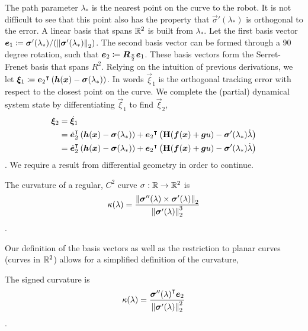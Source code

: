 \documentclass[oneside, 11pt]{book}
\begin{document}
The path parameter $\lambda_*$ is the nearest point on the curve to the robot. It is not difficult to see that this point also has the property that $\vec{\sigma}'(\lambda_*)$ is orthogonal to the error. A linear basis that spans $\mathbb{R}^2$ is built from $\lambda_*$. Let the first basis vector $\bm{e}_1 \coloneqq \bm{\sigma}'(\lambda_*)/(\mathop{}\!\left\|\bm{\sigma}'(\lambda_*)\right\|_2)$. The second basis vector can be formed through a 90 degree rotation, such that $\bm{e}_2 \coloneqq \bm{R}_{\frac{\pi}{2}}\bm{e}_1$. These basis vectors form the Serret-Frenet basis that spans $R^2$. Relying on the intuition of previous derivations, we let $\bm{\xi}_1 \coloneqq {\bm{e}_2}^{\intercal}\left(\bm{h}(\bm{x}) - \bm{\sigma}(\lambda_*)\right)$. In words $\vec{\xi}_1$ is the orthogonal tracking error with respect to the closest point on the curve. We complete the (partial) dynamical system state by differentiating $\vec{\xi}_1$ to find $\vec{\xi}_2$,
\begin{align*}
    \bm{\xi}_2     &=  \dot{\bm{\xi}}_1\\
                    &=  {\dot{\bm{e}}_2}^{\intercal}\left(\bm{h}(\bm{x}) - \bm{\sigma}(\lambda_*)\right)
                        +
                        {\bm{e}_2}^{\intercal}\left(\mathbf{H}(\bm{f}(\bm{x}) + \bm{g}u) - \bm{\sigma}'(\lambda_*)\dot{\lambda} \right)\\
                    &=  {\dot{\bm{e}}_2}^{\intercal}\left(\bm{h}(\bm{x}) - \bm{\sigma}(\lambda_*)\right)
                        +
                        {\bm{e}_2}^{\intercal}\left(\mathbf{H}(\bm{f}(\bm{x}) + \bm{g}u) - \bm{\sigma}'(\lambda_*)\dot{\lambda} \right)
\end{align*}.
We require a result from differential geometry in order to continue.
\begin{definition}[Curvature]
    The curvature of a regular, $C^2$ curve $\sigma:\mathbb{R}\to\mathbb{R}^2$ is
    \begin{equation}
        \kappa(\lambda) = \frac{\mathop{}\!\left\|\bm{\sigma}''(\lambda) \times \bm{\sigma}'(\lambda)\right\|_2}{\mathop{}\!\left\|\bm{\sigma}'(\lambda)\right\|_2^3}
    \end{equation}.
\end{definition}
Our definition of the basis vectors as well as the restriction to planar curves (curves in $\mathbb{R}^2$) allows for a simplified definition of the curvature,
\begin{lemma}
    The signed curvature is
    $$\kappa(\lambda) = \frac{{\bm{\sigma}''(\lambda)}^{\intercal}\bm{e}_2}{\mathop{}\!\left\|\bm{\sigma}'(\lambda)\right\|_2^2}$$.
    \label{lem:signed_curvature}
\end{lemma}
\end{document}
